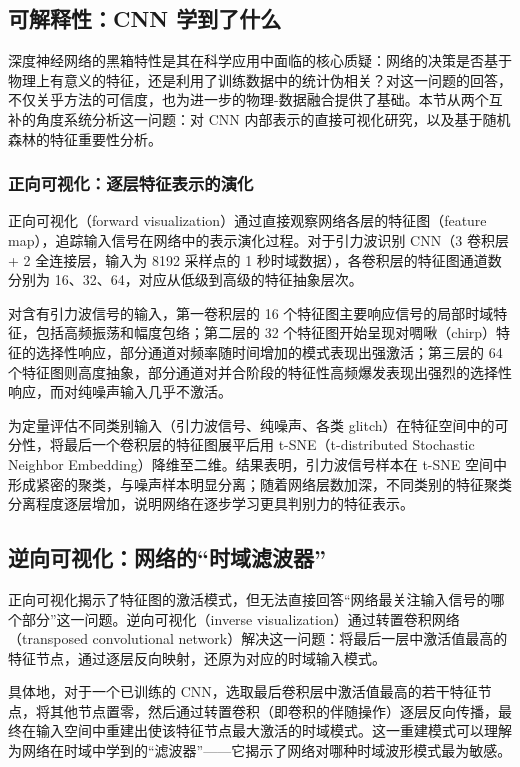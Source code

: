 \subsection{可解释性：CNN 学到了什么}

深度神经网络的黑箱特性是其在科学应用中面临的核心质疑：网络的决策是否基于物理上有意义的特征，还是利用了训练数据中的统计伪相关？对这一问题的回答，不仅关乎方法的可信度，也为进一步的物理-数据融合提供了基础。本节从两个互补的角度系统分析这一问题：对 CNN 内部表示的直接可视化研究，以及基于随机森林的特征重要性分析。

\subsubsection*{正向可视化：逐层特征表示的演化}

正向可视化（forward visualization）通过直接观察网络各层的特征图（feature map），追踪输入信号在网络中的表示演化过程。对于引力波识别 CNN（3 卷积层 + 2 全连接层，输入为 8192 采样点的 1 秒时域数据），各卷积层的特征图通道数分别为 16、32、64，对应从低级到高级的特征抽象层次。

对含有引力波信号的输入，第一卷积层的 16 个特征图主要响应信号的局部时域特征，包括高频振荡和幅度包络；第二层的 32 个特征图开始呈现对啁啾（chirp）特征的选择性响应，部分通道对频率随时间增加的模式表现出强激活；第三层的 64 个特征图则高度抽象，部分通道对并合阶段的特征性高频爆发表现出强烈的选择性响应，而对纯噪声输入几乎不激活。

为定量评估不同类别输入（引力波信号、纯噪声、各类 glitch）在特征空间中的可分性，将最后一个卷积层的特征图展平后用 t-SNE（t-distributed Stochastic Neighbor Embedding）降维至二维。结果表明，引力波信号样本在 t-SNE 空间中形成紧密的聚类，与噪声样本明显分离；随着网络层数加深，不同类别的特征聚类分离程度逐层增加，说明网络在逐步学习更具判别力的特征表示。

\subsection{逆向可视化：网络的“时域滤波器”}

正向可视化揭示了特征图的激活模式，但无法直接回答“网络最关注输入信号的哪个部分”这一问题。逆向可视化（inverse visualization）通过转置卷积网络（transposed convolutional network）解决这一问题：将最后一层中激活值最高的特征节点，通过逐层反向映射，还原为对应的时域输入模式。

具体地，对于一个已训练的 CNN，选取最后卷积层中激活值最高的若干特征节点，将其他节点置零，然后通过转置卷积（即卷积的伴随操作）逐层反向传播，最终在输入空间中重建出使该特征节点最大激活的时域模式。这一重建模式可以理解为网络在时域中学到的“滤波器”——它揭示了网络对哪种时域波形模式最为敏感。

